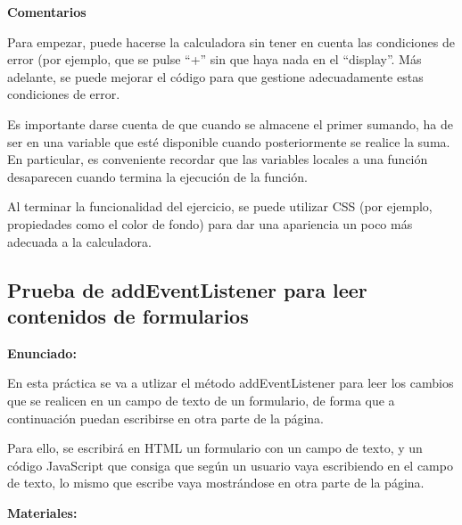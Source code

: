 \textbf{Comentarios}

Para empezar, puede hacerse la calculadora sin tener en cuenta las condiciones de error (por ejemplo, que se pulse ``+'' sin que haya nada en el ``display''. Más adelante, se puede mejorar el código para que gestione adecuadamente estas condiciones de error.

Es importante darse cuenta de que cuando se almacene el primer sumando, ha de ser en una variable que esté disponible cuando posteriormente se realice la suma. En particular, es conveniente recordar que las variables locales a una función desaparecen cuando termina la ejecución de la función.

Al terminar la funcionalidad del ejercicio, se puede utilizar CSS (por ejemplo, propiedades como el color de fondo) para dar una apariencia un poco más adecuada a la calculadora.



\subsection{Prueba de addEventListener para leer contenidos de formularios}
\label{subsec:eje-js-addeventlistener-form}

\textbf{Enunciado:}

En esta práctica se va a utlizar el método addEventListener para leer los cambios que se realicen en un campo de texto de un formulario, de forma que a continuación puedan escribirse en otra parte de la página.

Para ello, se escribirá en HTML un formulario con un campo de texto, y un código JavaScript que consiga que según un usuario vaya escribiendo en el campo de texto, lo mismo que escribe vaya mostrándose en otra parte de la página.

\textbf{Materiales:}

